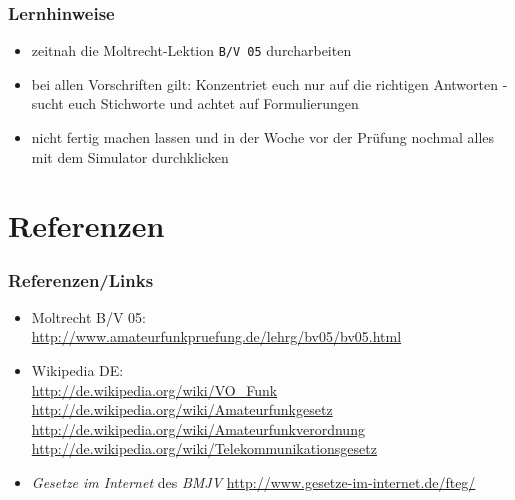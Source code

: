 \begin{frame}
    \frametitle{Lernhinweise}

    \begin{itemize}
        \item zeitnah die Moltrecht-Lektion \texttt{B/V 05} durcharbeiten
        \item bei allen Vorschriften gilt: Konzentriet euch nur auf die
              richtigen Antworten - sucht euch Stichworte und achtet auf
              Formulierungen
        \item nicht fertig machen lassen und in der Woche vor der Prüfung
              nochmal alles mit dem Simulator durchklicken
    \end{itemize}

\end{frame}

\section{Referenzen}

\begin{frame}
    \frametitle{Referenzen/Links}
    
    \footnotesize
    \begin{itemize}
        \item Moltrecht B/V 05: \\
              \url{http://www.amateurfunkpruefung.de/lehrg/bv05/bv05.html}
        \item Wikipedia DE: \\
              \url{http://de.wikipedia.org/wiki/VO\_Funk} \\
              \url{http://de.wikipedia.org/wiki/Amateurfunkgesetz}
              \url{http://de.wikipedia.org/wiki/Amateurfunkverordnung}
              \url{http://de.wikipedia.org/wiki/Telekommunikationsgesetz}
        \item \emph{Gesetze im Internet} des \emph{BMJV}
              \url{http://www.gesetze-im-internet.de/fteg/}
    \end{itemize}

\end{frame}


